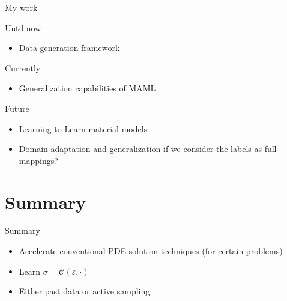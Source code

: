 \begin{frame}{My work}
\centering
\begin{block}{\color{White} Until now}
  \begin{itemize}
    \item Data generation framework
  \end{itemize}
\end{block}
\begin{block}{\color{White} Currently}
  \begin{itemize}
    \item Generalization capabilities of MAML
  \end{itemize}
\end{block}
\begin{block}{\color{White} Future}
  \begin{itemize}
    \item Learning to Learn material models
    \item Domain adaptation and generalization if we consider the labels as full mappings?
  \end{itemize}
\end{block}
\end{frame}

\section{Summary}
\begin{frame}{Summary}
  \begin{itemize}
    \item Accelerate conventional PDE solution techniques (for certain problems)
    \item Learn $\sigma=\mathcal{C}(\varepsilon, \cdot)$ 
    \item Either past data or active sampling
  \end{itemize}
\end{frame}

